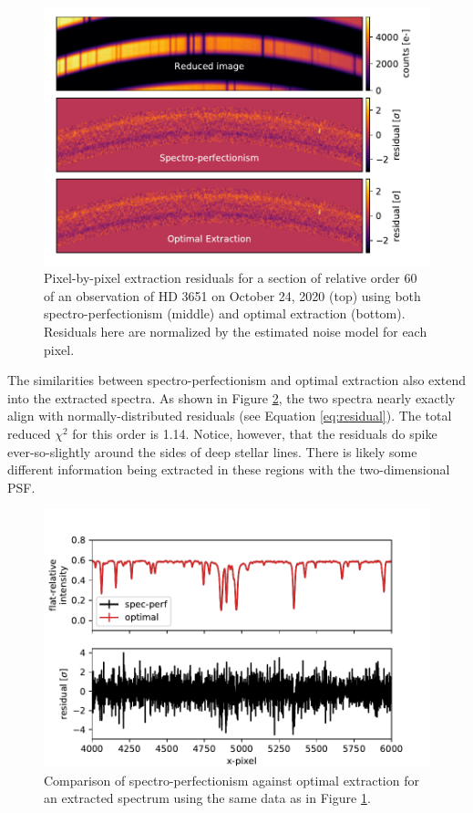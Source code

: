 \begin{figure}
    \centering
    \includegraphics[width=\textwidth]{figures-5/extraction-residuals.pdf}
    \caption{Pixel-by-pixel extraction residuals for a section of relative order 60 of an observation of HD 3651 on October 24, 2020 (top) using both spectro-perfectionism (middle) and optimal extraction (bottom). Residuals here are normalized by the estimated noise model for each pixel.}
    \label{fig:extraction-residuals}
\end{figure}

The similarities between spectro-perfectionism and optimal extraction also extend into the extracted spectra. As shown in Figure \ref{fig:spec-perf-vs-optimal}, the two spectra nearly exactly align with normally-distributed residuals (see Equation \ref{eq:residual}). The total reduced $\chi^2$ for this order is 1.14. Notice, however, that the residuals do spike ever-so-slightly around the sides of deep stellar lines. There is likely some different information being extracted in these regions with the two-dimensional PSF.

\begin{figure}
    \centering
    \includegraphics{figures-5/spec-perf-vs-optimal.pdf}
    \caption{Comparison of spectro-perfectionism against optimal extraction for an extracted spectrum using the same data as in Figure \ref{fig:extraction-residuals}.}
    \label{fig:spec-perf-vs-optimal}
\end{figure}

